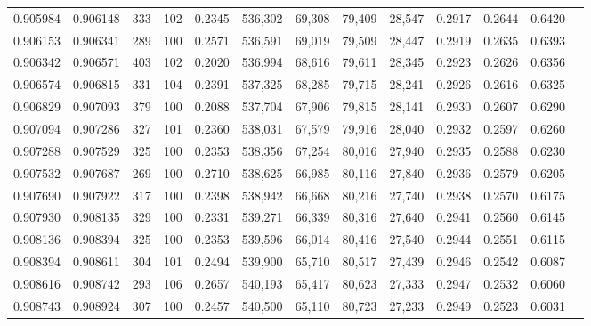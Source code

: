\begin{tabular}{rrrrrrrrrrrrr}
0.905984 & 0.906148 &   333 & 102 &                                     0.2345 & 536,302 &  69,308 &  79,409 &  28,547 & 0.2917 & 0.2644 & 0.6420 \\
0.906153 & 0.906341 &   289 & 100 &                                     0.2571 & 536,591 &  69,019 &  79,509 &  28,447 & 0.2919 & 0.2635 & 0.6393 \\
0.906342 & 0.906571 &   403 & 102 &                                     0.2020 & 536,994 &  68,616 &  79,611 &  28,345 & 0.2923 & 0.2626 & 0.6356 \\
0.906574 & 0.906815 &   331 & 104 &                                     0.2391 & 537,325 &  68,285 &  79,715 &  28,241 & 0.2926 & 0.2616 & 0.6325 \\
0.906829 & 0.907093 &   379 & 100 &                                     0.2088 & 537,704 &  67,906 &  79,815 &  28,141 & 0.2930 & 0.2607 & 0.6290 \\
0.907094 & 0.907286 &   327 & 101 &                                     0.2360 & 538,031 &  67,579 &  79,916 &  28,040 & 0.2932 & 0.2597 & 0.6260 \\
0.907288 & 0.907529 &   325 & 100 &                                     0.2353 & 538,356 &  67,254 &  80,016 &  27,940 & 0.2935 & 0.2588 & 0.6230 \\
0.907532 & 0.907687 &   269 & 100 &                                     0.2710 & 538,625 &  66,985 &  80,116 &  27,840 & 0.2936 & 0.2579 & 0.6205 \\
0.907690 & 0.907922 &   317 & 100 &                                     0.2398 & 538,942 &  66,668 &  80,216 &  27,740 & 0.2938 & 0.2570 & 0.6175 \\
0.907930 & 0.908135 &   329 & 100 &                                     0.2331 & 539,271 &  66,339 &  80,316 &  27,640 & 0.2941 & 0.2560 & 0.6145 \\
0.908136 & 0.908394 &   325 & 100 &                                     0.2353 & 539,596 &  66,014 &  80,416 &  27,540 & 0.2944 & 0.2551 & 0.6115 \\
0.908394 & 0.908611 &   304 & 101 &                                     0.2494 & 539,900 &  65,710 &  80,517 &  27,439 & 0.2946 & 0.2542 & 0.6087 \\
0.908616 & 0.908742 &   293 & 106 &                                     0.2657 & 540,193 &  65,417 &  80,623 &  27,333 & 0.2947 & 0.2532 & 0.6060 \\
0.908743 & 0.908924 &   307 & 100 &                                     0.2457 & 540,500 &  65,110 &  80,723 &  27,233 & 0.2949 & 0.2523 & 0.6031 \\

\end{tabular}

